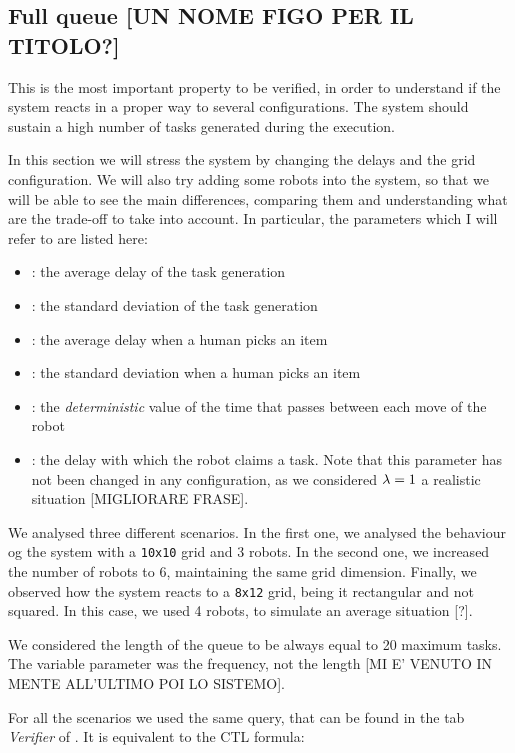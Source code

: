 \subsection{Full queue [UN NOME FIGO PER IL TITOLO?]}
This is the most important property to be verified, in order to understand if the system reacts in a proper way to several configurations. The system should sustain a high number of tasks generated during the execution.

In this section we will stress the system by changing the delays and the grid configuration. We will also try adding some robots into the system, so that we will be able to see the main differences, comparing them and understanding what are the trade-off to take into account. In particular, the parameters which I will refer to are listed here:
\begin{itemize}
    \item \mT: the average delay of the task generation
    \item \vT: the standard deviation of the task generation
    \item \mH: the average delay when a human picks an item
    \item \vH: the standard deviation when a human picks an item
    \item \K: the \emph{deterministic} value of the time that passes between each move of the robot
    \item \expdel: the delay with which the robot claims a task. Note that this parameter has not been changed in any configuration, as we considered $\lambda= 1$ a realistic situation [MIGLIORARE FRASE].
\end{itemize}

We analysed three different scenarios. In the first one, we analysed the behaviour og the system with a \texttt{10x10} grid and 3 robots. In the second one, we increased the number of robots to 6, maintaining the same grid dimension. Finally, we observed how the system reacts to a \texttt{8x12} grid, being it rectangular and not squared. In this case, we used 4 robots, to simulate an average situation [?].

We considered the length of the queue to be always equal to 20 maximum tasks. The variable parameter was the frequency, not the length [MI E' VENUTO IN MENTE ALL'ULTIMO POI LO SISTEMO].

For all the scenarios we used the same query, that can be found in the tab \emph{Verifier} of \UPPAAL. It is equivalent to the CTL formula:

